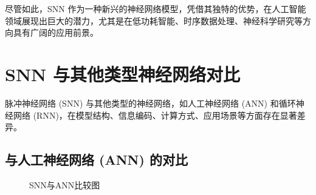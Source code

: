 \documentclass[12pt, a4paper, oneside]{ctexart}
\numberwithin{equation}{section}  %
\begin{document}
尽管如此，SNN 作为一种新兴的神经网络模型，凭借其独特的优势，在人工智能领域展现出巨大的潜力，尤其是在低功耗智能、时序数据处理、神经科学研究等方向具有广阔的应用前景。
\section{SNN 与其他类型神经网络对比}
脉冲神经网络 (SNN) 与其他类型的神经网络，如人工神经网络 (ANN) 和循环神经网络 (RNN)，在模型结构、信息编码、计算方式、应用场景等方面存在显著差异\cite{ref4,ref5}。
\subsection{与人工神经网络 (ANN) 的对比}
\begin{figure}[H]
  \centering
  \setlength{\abovecaptionskip}{0ex}  %
  \label{fig-snn-ann}
  \caption{SNN与ANN比较图}
\end{figure}
\end{document}

